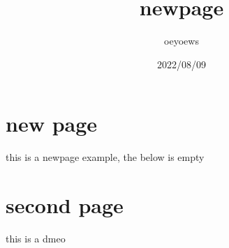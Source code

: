 \documentclass{article}
\title{newpage}
\author{oeyoews}
\date{2022/08/09}
\begin{document}
\maketitle


\section{new page}%
\label{sec:new page}

this is a newpage example, the below is empty

\newpage

\section{second page}
\label{sec:second page}

this is a dmeo
\end{document}
